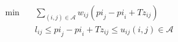 \begin{align}
  \min\quad & \sum_{\left(i , j\right) \in \mathcal{A}} w_{\mathit{ij}} \left(\mathit{pi}_{j} - \mathit{pi}_{i} + \mathit{Tz}_{\mathit{ij}}\right) \tag{eq\_0003} \\
  & l_{\mathit{ij}} \leq \mathit{pi}_{j} - \mathit{pi}_{i} + \mathit{Tz}_{\mathit{ij}} \leq u_{\mathit{ij}} \left(i , j\right) \in \mathcal{A} \tag{eq\_0004} \\
\end{align}
